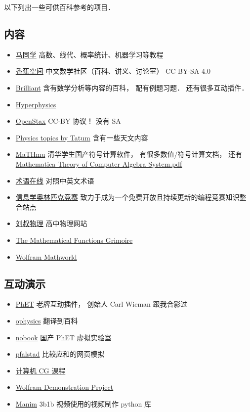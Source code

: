 
以下列出一些可供百科参考的项目．

\subsection{内容}
\begin{itemize}
\item \href{https://www.matongxue.com/}{马同学} 高数、线代、概率统计、机器学习等教程
\item \href{https://www.bananaspace.org/wiki/}{香蕉空间} 中文数学社区（百科、讲义、讨论室） CC BY-SA 4.0
\item \href{https://brilliant.org/}{Brilliant} 含有数学分析等内容的百科， 配有例题习题． 还有很多互动插件．
\item \href{http://hyperphysics.phy-astr.gsu.edu/}{Hyperphysics}
\item \href{https://openstax.org/}{OpenStax} CC-BY 协议！ 没有 SA
\item \href{http://www.astro.uvic.ca/~tatum/index.php}{Physics topics by Tatum} 含有一些天文内容
\item \href{http://mathmu.github.io/MTCAS/RecentChanges.html}{MaTHmu} 清华学生国产符号计算软件， 有很多数值/符号计算文档， 还有 \href{https://github.com/maTHmU/MTCAS}{Mathematica Theory of Computer Algebra System.pdf}
\item \href{https://www.termonline.cn/index}{术语在线} 对照中英文术语
\item \href{https://oi-wiki.org/}{信息学奥林匹克竞赛} 致力于成为一个免费开放且持续更新的编程竞赛知识整合站点
\item \href{http://www.myliushu.com/}{刘叔物理} 高中物理网站
\item \href{https://fungrim.org/}{The Mathematical Functions Grimoire}
\item \href{https://mathworld.wolfram.com/}{Wolfram Mathworld}
\end{itemize}

\subsection{互动演示}
\begin{itemize}
\item \href{https://phet.colorado.edu/}{PhET} 老牌互动插件， 创始人 Carl Wieman 跟我合影过
\item \href{https://ophysics.com/}{ophysics} 翻译到百科
\item \href{https://www.nobook.com/}{nobook} 国产 PhET 虚拟实验室
\item \href{https://www.falstad.com/}{pfalstad} 比较应和的网页模拟
\item \href{http://www.cs.cornell.edu/courses/cs5643/2010sp/}{计算机 CG 课程}
\item \href{https://demonstrations.wolfram.com/topics.php?PhysicalSciences#5}{Wolfram Demonstration Project}
\item \href{https://github.com/3b1b/manim}{Manim} 3b1b 视频使用的视频制作 python 库
\end{itemize}

